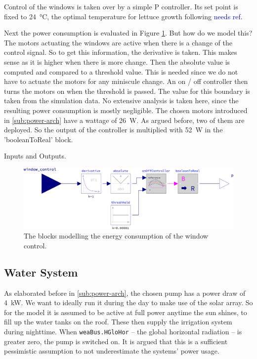 Control of the windows is taken over by a simple P controller.
Its set point is fixed to \SI{24}{\degreeCelsius}, the optimal temperature for lettuce growth following \textcolor{Blue}{needs ref}.

Next the power consumption is evaluated in Figure \ref{fig:window-motors}.
But how do we model this?
The motors actuating the windows are active when there is a change of the control signal.
So to get this information, the derivative is taken.
This makes sense as it is higher when there is more change.
Then the absolute value is computed and compared to a threshold value.
This is needed since we do not have to actuate the motors for any miniscule change.
An on / off controller then turns the motors on when the threshold is passed.
The value for this boundary is taken from the simulation data.
No extensive analysis is taken here, since the resulting power consumption is mostly negligible.
The chosen motors introduced in \ref{sub:power-arch} have a wattage of \SI{26}{\W}.
As argued before, two of them are deployed.
So the output of the controller is multiplied with \SI{52}{\W} in the 'booleanToReal' block.

Inputs and Outputs.

\begin{figure}[htbp]
  \centering
  \includegraphics[width=\textwidth]{img/simulation/window-motors.pdf}
  \caption{The blocks modelling the energy consumption of the window control.}
  \label{fig:window-motors}
\end{figure}

\subsection{Water System}
As elaborated before in \ref{sub:power-arch}, the chosen pump has a power draw of \SI{4}{\kW}.
We want to ideally run it during the day to make use of the solar array.
So for the model it is assumed to be active at full power anytime the sun shines, to fill up the water tanks on the roof.
These then supply the irrigation system during nighttime.
When \lstinline{weaBus.HGloHor} -- the global horizontal radiation -- is greater zero, the pump is switched on.
It is argued that this is a sufficient pessimistic assumption to not underestimate the systems' power usage.

